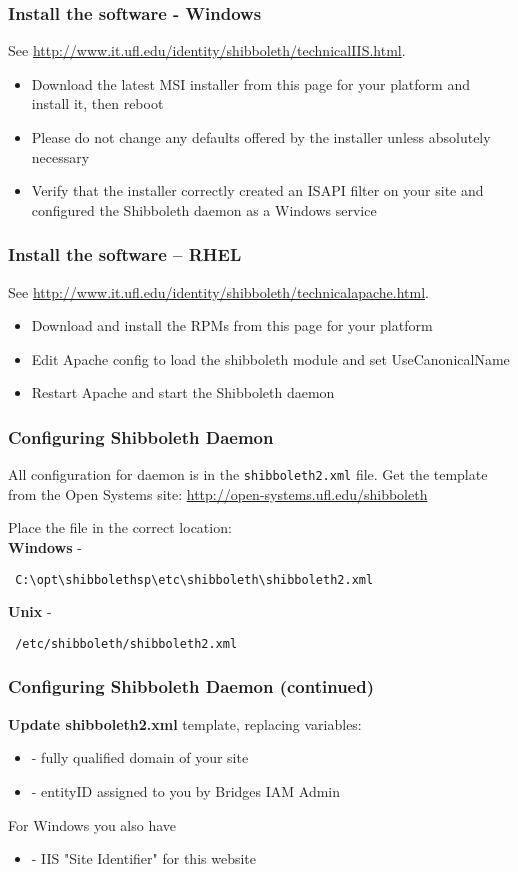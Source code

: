 \begin{frame}
\frametitle{Install the software - Windows}
{\tiny See \url{http://www.it.ufl.edu/identity/shibboleth/technicalIIS.html}.}

\begin{itemize}
\item Download the latest MSI installer from this page for your platform and install it, then reboot
\item Please do not change any defaults offered by the installer unless absolutely necessary
\item Verify that the installer correctly created an ISAPI filter on your site and configured the Shibboleth daemon as a Windows service
\end{itemize}

\end{frame}

\begin{frame}
\frametitle{Install the software – RHEL}
{\tiny See \url{http://www.it.ufl.edu/identity/shibboleth/technicalapache.html}.}

\begin{itemize}
\item Download and install the RPMs from this page for your platform
\item Edit Apache config to load the shibboleth module and set UseCanonicalName
\item Restart Apache and start the Shibboleth daemon
\end{itemize}

\end{frame}

\begin{frame}[fragile]
\frametitle{Configuring Shibboleth Daemon}
All configuration for daemon is in the \texttt{shibboleth2.xml} file. Get the template from the Open Systems site:
\url{http://open-systems.ufl.edu/shibboleth}
\bigskip

Place the file in the correct location: \\ \bigskip
\textbf{Windows} - \begin{verbatim} C:\opt\shibbolethsp\etc\shibboleth\shibboleth2.xml \end{verbatim}
\textbf{Unix} - \begin{verbatim} /etc/shibboleth/shibboleth2.xml \end{verbatim}
\end{frame}

\begin{frame}
\frametitle{Configuring Shibboleth Daemon (continued)}
\textbf{Update shibboleth2.xml} template, replacing variables: \\
\begin{itemize}
\item {} - fully qualified domain of your site 
\item {} - entityID assigned to you by Bridges IAM Admin
\end{itemize}
For Windows you also have
\begin{itemize}
\item {} - IIS "Site Identifier" for this website
\end{itemize}
\end{frame}

